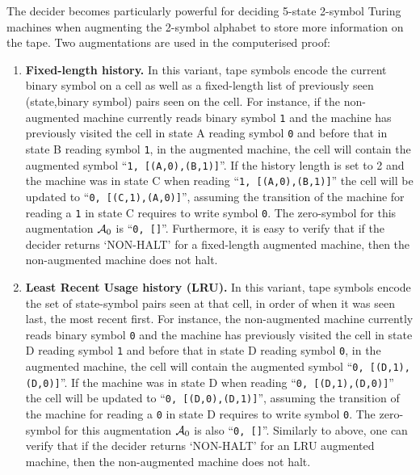 The \ngramcps decider becomes particularly powerful for deciding 5-state 2-symbol Turing machines when augmenting the 2-symbol alphabet to store more information on the tape. Two augmentations are used in the computerised proof:

\begin{enumerate}
    \item \textbf{Fixed-length history.} In this variant, tape symbols encode the current binary symbol on a cell as well as a fixed-length list of previously seen (state,binary symbol) pairs seen on the cell. For instance, if the non-augmented machine currently reads binary symbol \texttt{1} and the machine has previously visited the cell in state \textcolor{colorA}{A} reading symbol \texttt{0} and before that in state \textcolor{colorB}{B} reading symbol \texttt{1}, in the augmented machine, the cell will contain the augmented symbol ``\texttt{1, [(A,0),(B,1)]}''. If the history length is set to 2 and the machine was in state \textcolor{colorC}{C} when reading ``\texttt{1, [(A,0),(B,1)]}'' the cell will be updated to ``\texttt{0, [(C,1),(A,0)]}'', assuming the transition of the machine for reading a \texttt{1} in state \textcolor{colorC}{C} requires to write symbol \texttt{0}. The zero-symbol for this augmentation $\mathcal{A}_0$ is ``\texttt{0, []}''. Furthermore, it is easy to verify that if the decider returns `NON-HALT' for a fixed-length augmented machine, then the non-augmented machine does not halt.
    \item \textbf{Least Recent Usage history (LRU).} In this variant, tape symbols encode the set of state-symbol pairs seen at that cell,
          in order of when it was seen last, the most recent first.  For instance, the non-augmented machine currently reads binary symbol \texttt{0} and the machine has previously visited the cell in state \textcolor{colorA}{D} reading symbol \texttt{1} and before that in state \textcolor{colorB}{D} reading symbol \texttt{0}, in the augmented machine, the cell will contain the augmented symbol ``\texttt{0, [(D,1),(D,0)]}''. If the machine was in state \textcolor{colorC}{D} when reading ``\texttt{0, [(D,1),(D,0)]}'' the cell will be updated to ``\texttt{0, [(D,0),(D,1)]}'', assuming the transition of the machine for reading a \texttt{0} in state \textcolor{colorC}{D} requires to write symbol \texttt{0}. The zero-symbol for this augmentation $\mathcal{A}_0$ is also ``\texttt{0, []}''. Similarly to above, one can verify that if the decider returns `NON-HALT' for an LRU augmented machine, then the non-augmented machine does not halt. 
\end{enumerate}


